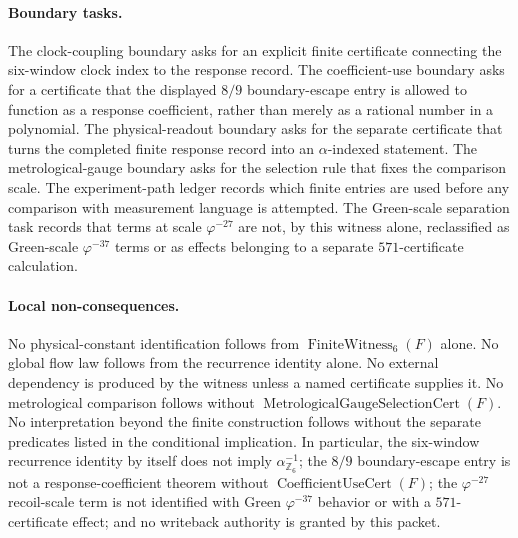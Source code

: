 \paragraph{Boundary tasks.}
The clock-coupling boundary asks for an explicit finite certificate connecting the six-window clock index to the response record.  The coefficient-use boundary asks for a certificate that the displayed $8/9$ boundary-escape entry is allowed to function as a response coefficient, rather than merely as a rational number in a polynomial.  The physical-readout boundary asks for the separate certificate that turns the completed finite response record into an $\alpha$-indexed statement.  The metrological-gauge boundary asks for the selection rule that fixes the comparison scale.  The experiment-path ledger records which finite entries are used before any comparison with measurement language is attempted.  The Green-scale separation task records that terms at scale $\varphi^{-27}$ are not, by this witness alone, reclassified as Green-scale $\varphi^{-37}$ terms or as effects belonging to a separate $571$-certificate calculation.

\paragraph{Local non-consequences.}
No physical-constant identification follows from $\operatorname{FiniteWitness}_{6}(F)$ alone.  No global flow law follows from the recurrence identity alone.  No external dependency is produced by the witness unless a named certificate supplies it.  No metrological comparison follows without $\operatorname{MetrologicalGaugeSelectionCert}(F)$.  No interpretation beyond the finite construction follows without the separate predicates listed in the conditional implication.  In particular, the six-window recurrence identity by itself does not imply $\alpha_{\mathbb Z_6}^{-1}$; the $8/9$ boundary-escape entry is not a response-coefficient theorem without $\operatorname{CoefficientUseCert}(F)$; the $\varphi^{-27}$ recoil-scale term is not identified with Green $\varphi^{-37}$ behavior or with a $571$-certificate effect; and no writeback authority is granted by this packet.
